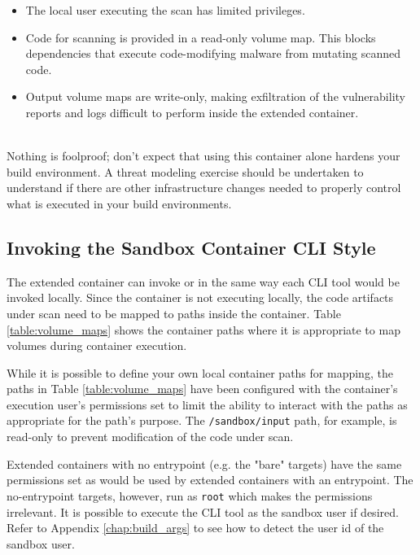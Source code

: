 \begin{itemize}
    \item The local user executing the scan has limited privileges.
    \item Code for scanning is provided in a read-only volume map.
    This blocks dependencies that execute code-modifying malware from mutating scanned code.
    \item Output volume maps are write-only, making exfiltration of the vulnerability reports and logs
    difficult to perform inside the extended container.
\end{itemize}

\noindent\\Nothing is foolproof; don't expect that using this container alone hardens your build
environment.  A threat modeling exercise should be undertaken to understand
if there are other infrastructure changes needed to properly control what is executed in your
build environments.

\subsection{Invoking the Sandbox Container CLI Style}\label{ssec:invoking_cli}

The extended container can invoke \scaresolver or \cxonecli in the same way each CLI tool would be
invoked locally.  Since the container is not executing locally, the code artifacts under scan
need to be mapped to paths inside the container.  Table \ref{table:volume_maps} shows the
container paths where it is appropriate to map volumes during container execution.  

While it is possible
to define your own local container paths for mapping, the paths in Table \ref{table:volume_maps}
have been configured with the container's execution user's permissions set to limit the ability to
interact with the paths as appropriate for the path's purpose.  The \texttt{/sandbox/input} path,
for example, is read-only to prevent modification of the code under scan.

Extended containers with no entrypoint (e.g. the "bare" targets) have the same permissions set
as would be used by extended containers with an entrypoint.  The no-entrypoint targets, however, run
as \texttt{root} which makes the permissions irrelevant.  It is possible to execute the CLI tool as
the sandbox user if desired.  Refer to Appendix \ref{chap:build_args} to see how to detect the user id
of the sandbox user.



